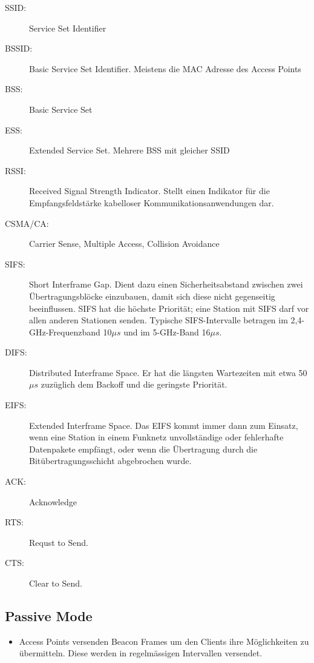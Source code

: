 \begin{description}
	\item[SSID:] Service Set Identifier
	\item[BSSID:] Basic Service Set Identifier. Meistens die MAC Adresse des Access Points
	\item[BSS:] Basic Service Set
	\item[ESS:] Extended Service Set. Mehrere BSS mit gleicher SSID
	\item[RSSI:] Received Signal Strength Indicator. Stellt einen Indikator für die Empfangsfeldstärke kabelloser Kommunikationsanwendungen dar.
	\item[CSMA/CA:] Carrier Sense, Multiple Access, Collision Avoidance
	\item[SIFS:] Short Interframe Gap. Dient dazu einen Sicherheitsabstand zwischen zwei Übertragungsblöcke einzubauen, damit sich diese nicht gegenseitig beeinflussen. SIFS hat die höchste Priorität; eine Station mit SIFS darf vor allen anderen Stationen senden. Typische SIFS-Intervalle betragen im 2,4-GHz-Frequenzband 10$\mu s$ und im 5-GHz-Band 16$\mu s$.  
	\item[DIFS:] Distributed Interframe Space. Er hat die längsten Wartezeiten mit etwa 50$\mu s$ zuzüglich dem Backoff und die geringste Priorität. 
	\item[EIFS:] Extended Interframe Space. Das EIFS kommt immer dann zum Einsatz, wenn eine Station in einem Funknetz unvollständige oder fehlerhafte Datenpakete empfängt, oder wenn die Übertragung durch die Bitübertragungsschicht abgebrochen wurde.
	\item[ACK:] Acknowledge
	\item[RTS:] Requst to Send.
	\item[CTS:] Clear to Send.
\end{description}

\subsection{Passive Mode}
\begin{itemize}
	\item Access Points versenden Beacon Frames um den Clients ihre Möglichkeiten zu übermitteln. Diese werden in regelmässigen Intervallen versendet.
\end{itemize}

